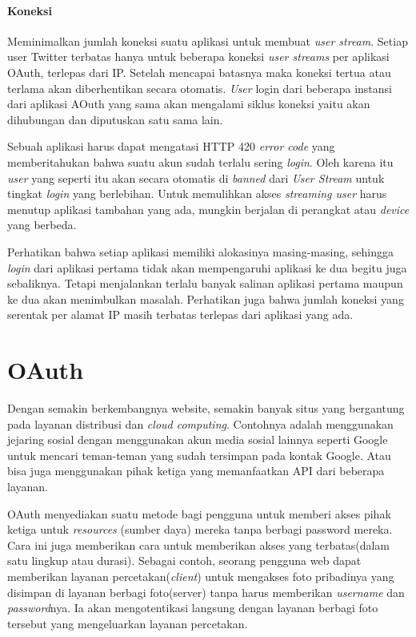 \paragraph{Koneksi}
Meminimalkan jumlah koneksi suatu aplikasi untuk membuat \textit{user stream}. Setiap user Twitter terbatas hanya untuk beberapa koneksi \textit{user streams} per aplikasi OAuth, terlepas dari IP. Setelah mencapai batasnya maka koneksi tertua atau terlama akan diberhentikan secara otomatis. \textit{User} login dari beberapa instansi dari aplikasi AOuth yang sama akan mengalami siklus koneksi yaitu akan dihubungan dan diputuskan satu sama lain.

Sebuah aplikasi harus dapat mengatasi HTTP 420 \textit{error code} yang memberitahukan bahwa suatu akun sudah terlalu sering \textit{login}. Oleh karena itu \textit{user} yang seperti itu akan secara otomatis di \textit{banned} dari \textit{User Stream} untuk tingkat \textit{login} yang berlebihan. Untuk memulihkan akses \textit{streaming user} harus menutup aplikasi tambahan yang ada, mungkin berjalan di perangkat atau \textit{device} yang berbeda.

Perhatikan bahwa setiap aplikasi memiliki alokasinya masing-masing, sehingga \textit{login} dari aplikasi pertama tidak akan mempengaruhi aplikasi ke dua begitu juga sebaliknya. Tetapi menjalankan terlalu banyak salinan aplikasi pertama maupun ke dua akan menimbulkan masalah. Perhatikan juga bahwa jumlah koneksi yang serentak per alamat IP masih terbatas terlepas dari aplikasi yang ada.

\section{OAuth}
\label{sec:oauth}
Dengan semakin berkembangnya website, semakin banyak situs yang bergantung pada layanan distribusi dan \textit{cloud computing}. Contohnya adalah menggunakan jejaring sosial dengan menggunakan akun media sosial lainnya seperti Google untuk mencari teman-teman yang sudah tersimpan pada kontak Google. Atau bisa juga menggunakan pihak ketiga yang memanfaatkan API dari beberapa layanan.

OAuth menyediakan suatu metode bagi pengguna untuk memberi akses pihak ketiga untuk \textit{resources} (sumber daya) mereka tanpa berbagi password mereka. Cara ini juga memberikan cara untuk memberikan akses yang terbatas(dalam satu lingkup atau durasi). Sebagai contoh, seorang pengguna web dapat memberikan layanan percetakan(\textit{client}) untuk mengakses foto pribadinya yang disimpan di layanan berbagi foto(server) tanpa harus memberikan \textit{username} dan \textit{password}nya. Ia akan mengotentikasi langsung dengan layanan berbagi foto tersebut yang mengeluarkan layanan percetakan.

